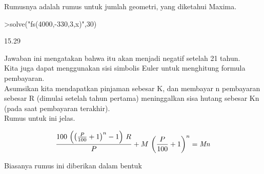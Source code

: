 \documentclass[a4paper,10pt]{article}
\begin{document}
\begin{eulernotebook}
\begin{eulercomment}
\begin{eulercomment}
\begin{eulercomment}
\begin{eulercomment}
\begin{eulercomment}
\begin{eulercomment}
\begin{eulercomment}
Rumusnya adalah rumus untuk jumlah geometri, yang diketahui Maxima.
\end{eulercomment}
\begin{eulerprompt}
>solve("fs(4000,-330,3,x)",30)
\end{eulerprompt}
\begin{euleroutput}
        15.29 
\end{euleroutput}
\begin{eulercomment}
Jawaban ini mengatakan bahwa itu akan menjadi negatif setelah 21
tahun.\\
Kita juga dapat menggunakan sisi simbolis Euler untuk menghitung
formula pembayaran.\\
Asumsikan kita mendapatkan pinjaman sebesar K, dan membayar n
pembayaran sebesar R (dimulai setelah tahun pertama) meninggalkan sisa
hutang sebesar Kn (pada saat pembayaran terakhir).\\
Rumus untuk ini jelas.
\end{eulercomment}
\begin{eulerformula}
\[
\frac{100\,\left(\left(\frac{P}{100}+1\right)^{n}-1\right)\,R}{P}+M  \,\left(\frac{P}{100}+1\right)^{n}={\it Mn}
\]
\end{eulerformula}
\begin{eulercomment}
Biasanya rumus ini diberikan dalam bentuk


\end{eulercomment}
\end{eulercomment}
\end{eulercomment}
\end{eulercomment}
\end{eulercomment}
\end{eulercomment}
\end{eulercomment}
\end{eulernotebook}
\end{document}
